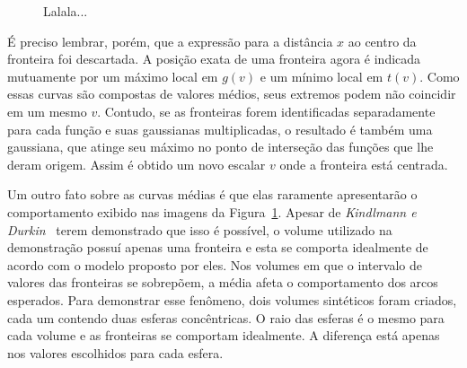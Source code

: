 \begin{figure}[h]
	\centering
	\label{fig:m_gauss}
	\caption{Lalala...}
\end{figure}
	
	É preciso lembrar, porém, que a expressão para a distância $ x $ ao centro da fronteira foi descartada. A posição exata de uma fronteira agora é indicada mutuamente por um máximo local em $ g(v) $ e um mínimo local em $ t(v) $. Como essas curvas são compostas de valores médios, seus extremos podem não coincidir em um mesmo $ v $. Contudo, se as fronteiras forem identificadas separadamente para cada função e suas gaussianas multiplicadas, o resultado é também uma gaussiana, que atinge seu máximo no ponto de interseção das funções que lhe deram origem. Assim é obtido um novo escalar $ v $ onde a fronteira está centrada.

	Um outro fato sobre as curvas médias é que elas raramente apresentarão o comportamento exibido nas imagens da Figura~\ref{fig:m_gauss}. Apesar de \textit{Kindlmann e Durkin}~\cite{gordon} terem demonstrado que isso é possível, o volume utilizado na demonstração possuí apenas uma fronteira e esta se comporta idealmente de acordo com o modelo proposto por eles. Nos volumes em que o intervalo de valores das fronteiras se sobrepõem, a média afeta o comportamento dos arcos esperados. Para demonstrar esse fenômeno, dois volumes sintéticos foram criados, cada um contendo duas esferas concêntricas. O raio das esferas é o mesmo para cada volume e as fronteiras se comportam idealmente. A diferença está apenas nos valores escolhidos para cada esfera.
	

